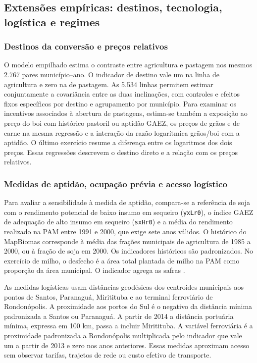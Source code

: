 \subsection{Extensões empíricas: destinos, tecnologia, logística e regimes}
\label{estrategia-extensoes}

\subsubsection{Destinos da conversão e preços relativos}
O modelo empilhado estima o contraste entre agricultura e pastagem nos mesmos 2.767 pares município--ano. O indicador de destino vale um na linha de agricultura e zero na de pastagem. As 5.534 linhas permitem estimar conjuntamente a covariância entre as duas inclinações, com controles e efeitos fixos específicos por destino e agrupamento por município. Para examinar os incentivos associados à abertura de pastagens, estima-se também a exposição ao preço do boi com histórico pastoril ou aptidão GAEZ, os preços de grãos e de carne na mesma regressão e a interação da razão logarítmica grãos/boi com a aptidão. O último exercício resume a diferença entre os logaritmos dos dois preços. Essas regressões descrevem o destino direto e a relação com os preços relativos.

\subsubsection{Medidas de aptidão, ocupação prévia e acesso logístico}
Para avaliar a sensibilidade à medida de aptidão, compara-se a referência de soja com o rendimento potencial de baixo insumo em sequeiro (\texttt{yxLr0}), o índice GAEZ de adequação de alto insumo em sequeiro (\texttt{sxHr0}) e a média do rendimento realizado na PAM entre 1991 e 2000, que exige sete anos válidos. O histórico do MapBiomas corresponde à média das frações municipais de agricultura de 1985 a 2000, ou à fração de soja em 2000. Os indicadores históricos são padronizados. No exercício de milho, o desfecho é a área total plantada de milho na PAM como proporção da área municipal. O indicador agrega as safras \cite{FAOGAEZ2021, MapBiomas2026, IBGEPAM2026}.

As medidas logísticas usam distâncias geodésicas dos centroides municipais aos pontos de Santos, Paranaguá, Miritituba e ao terminal ferroviário de Rondonópolis. A proximidade aos portos do Sul é o negativo da distância mínima padronizada a Santos ou Paranaguá. A partir de 2014 a distância portuária mínima, expressa em 100 km, passa a incluir Miritituba. A variável ferroviária é a proximidade padronizada a Rondonópolis multiplicada pelo indicador que vale um a partir de 2013 e zero nos anos anteriores. Essas medidas aproximam acesso sem observar tarifas, trajetos de rede ou custo efetivo de transporte.


